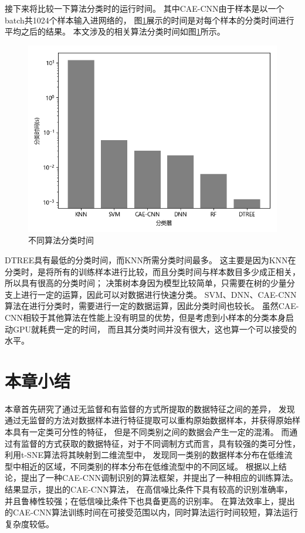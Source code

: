 接下来将比较一下算法分类时的运行时间。
其中CAE-CNN由于样本是以一个batch共1024个样本输入进网络的，
图\ref{sec:fig_3_13}展示的时间是对每个样本的分类时间进行平均之后的结果。
本文涉及的相关算法分类时间如图\ref{sec:fig_3_13}所示。\par
\begin{figure}[!h]
	\centering
	\includegraphics[scale=0.65]{figures/chapter_3/fig_3_13}
	\caption{不同算法分类时间}	\label{sec:fig_3_13}
\end{figure}
DTREE具有最低的分类时间，而KNN所需分类时间最多。
这主要是因为KNN在分类时，是将所有的训练样本进行比较，而且分类时间与样本数目多少成正相关，所以具有很高的分类时间；
决策树本身因为模型比较简单，只需要在树的少量分支上进行一定的运算，因此可以对数据进行快速分类。
SVM、DNN、CAE-CNN算法在进行分类时，需要进行一定的数据运算，因此分类时间也较长。
虽然CAE-CNN相较于其他算法在性能上没有明显的优势，但是考虑到小样本的分类本身启动GPU就耗费一定的时间，
而且其分类时间并没有很大，这也算一个可以接受的水平。
\par

\section{本章小结}

本章首先研究了通过无监督和有监督的方式所提取的数据特征之间的差异，
发现通过无监督的方法对数据样本进行特征提取可以重构原始数据样本，并获得原始样本具有一定类可分性的特征，
但是不同类别之间的数据会产生一定的混淆。
而通过有监督的方式获取的数据特征，对于不同调制方式而言，具有较强的类可分性，利用t-SNE算法将其映射到二维流型中，
发现同一类别的数据样本分布在低维流型中相近的区域，不同类别的样本分布在低维流型中的不同区域。
根据以上结论，提出了一种CAE-CNN调制识别的算法框架，并提出了一种相应的训练算法。
结果显示，提出的CAE-CNN算法，
在高信噪比条件下具有较高的识别准确率，并且鲁棒性较强；在低信噪比条件下也具备更高的识别率。
在算法效率上，提出的CAE-CNN算法训练时间在可接受范围以内，同时算法运行时间较短，算法运行复杂度较低。\par

